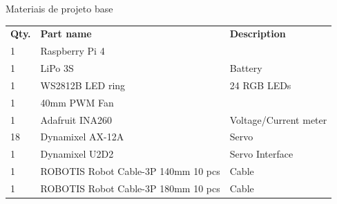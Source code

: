 \begin{frame}[c]{Materiais de projeto base}
    \begin{center}
\begin{table}[]
    \small
    \begin{tabular}{lll}
    \rowcolor[HTML]{FCFCFC} 
    {\color[HTML]{404040} \textbf{Qty.}} & {\color[HTML]{404040} \textbf{Part name}}                  & {\color[HTML]{404040} \textbf{Description}}  \\
    \rowcolor[HTML]{F3F6F6} 
    {\color[HTML]{404040} 1}             & {\color[HTML]{404040} Raspberry Pi 4}                      & {\color[HTML]{404040} }                      \\
    \rowcolor[HTML]{FCFCFC} 
    {\color[HTML]{404040} 1}             & {\color[HTML]{404040} LiPo 3S}                             & {\color[HTML]{404040} Battery}               \\
    \rowcolor[HTML]{F3F6F6} 
    {\color[HTML]{404040} 1}             & {\color[HTML]{404040} WS2812B LED ring}                    & {\color[HTML]{404040} 24 RGB LEDs}           \\
    \rowcolor[HTML]{FCFCFC} 
    {\color[HTML]{404040} 1}             & {\color[HTML]{404040} 40mm PWM Fan}                        & {\color[HTML]{404040} }                      \\
    \rowcolor[HTML]{F3F6F6} 
    {\color[HTML]{404040} 1}             & {\color[HTML]{404040} Adafruit INA260}                     & {\color[HTML]{404040} Voltage/Current meter} \\
    \rowcolor[HTML]{FCFCFC} 
    {\color[HTML]{404040} 18}            & {\color[HTML]{404040} Dynamixel AX-12A}                    & {\color[HTML]{404040} Servo}                 \\
    \rowcolor[HTML]{F3F6F6} 
    {\color[HTML]{404040} 1}             & {\color[HTML]{404040} Dynamixel U2D2}                      & {\color[HTML]{404040} Servo Interface}       \\
    \rowcolor[HTML]{FCFCFC} 
    {\color[HTML]{404040} 1}             & {\color[HTML]{404040} ROBOTIS Robot Cable-3P 140mm 10 pcs} & {\color[HTML]{404040} Cable}                 \\
    \rowcolor[HTML]{F3F6F6} 
    {\color[HTML]{404040} 1}             & {\color[HTML]{404040} ROBOTIS Robot Cable-3P 180mm 10 pcs} & {\color[HTML]{404040} Cable}                 \\

\end{tabular}
\end{table}
\end{center}
\end{frame}
